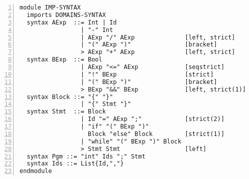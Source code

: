 \begin{lstlisting}[float=ht,
  frame=single,
  style=ksty,
  language=k,
  numbers=left,
  numbersep=5pt,
  caption={Imp Syntax in $\K$},
  label={lst:imp-syntax}
]
module IMP-SYNTAX                                               @\label{lstline:imp-module-start}@
  imports DOMAINS-SYNTAX                                        @\label{lstline:imp-syntax-import}@
  syntax AExp  ::= Int | Id                                     @\label{lstline:imp-aexp-start}@
                 | "-" Int
                 | AExp "/" AExp              [left, strict]    @\label{lstline:imp-aexp-div}@
                 | "(" AExp ")"               [bracket]
                 > AExp "+" AExp              [left, strict]    @\label{lstline:imp-aexp-end}@
  syntax BExp  ::= Bool
                 | AExp "<=" AExp             [seqstrict]
                 | "!" BExp                   [strict]
                 | "(" BExp ")"               [bracket]
                 > BExp "&&" BExp             [left, strict(1)] @\label{lstline:imp-bexp-and}@
  syntax Block ::= "{" "}"
                 | "{" Stmt "}"
  syntax Stmt  ::= Block                                        @\label{lstline:imp-stmt-block}@
                 | Id "=" AExp ";"            [strict(2)]       @\label{lstline:imp-stmt-assgn}@
                 | "if" "(" BExp ")"
                   Block "else" Block         [strict(1)]
                 | "while" "(" BExp ")" Block                   @\label{lstline:imp-stmt-while}@
                 > Stmt Stmt                  [left]            @\label{lstline:imp-stmt-comp}@
  syntax Pgm ::= "int" Ids ";" Stmt                             @\label{lstline:imp-pgm}@
  syntax Ids ::= List{Id,","}                                   @\label{lstline:imp-ids}@
endmodule                                                       @\label{lstline:imp-module-end}@
\end{lstlisting}

